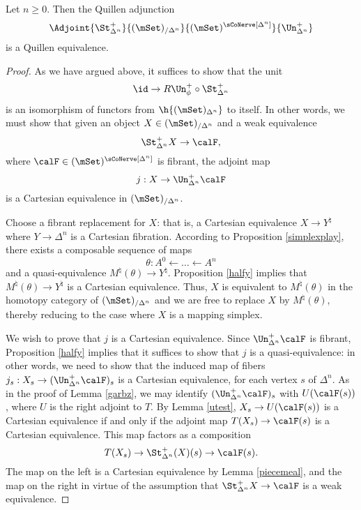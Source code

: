 \begin{proposition}\label{speccase}
Let $n \geq 0$. Then the Quillen adjunction 
$$\Adjoint{\St^{+}_{\Delta^n}}{ (\mSet)_{/ \Delta^n} }{ (\mSet)^{\sCoNerve[\Delta^n]}}{ \Un^{+}_{\Delta^n}}$$ is a Quillen equivalence.
\end{proposition}

\begin{proof}
As we have argued above, it suffices to show that the unit
$$ \id \rightarrow R \Un^{+}_{\phi} \circ \St^{+}_{\Delta^n}$$
is an isomorphism of functors from $\h{ (\mSet)_{\Delta^n}}$ to itself. In other words, we must show that given an object
$X \in (\mSet)_{/ \Delta^n}$ and a weak equivalence
$$ \St^{+}_{\Delta^n} X \rightarrow \calF,$$
where $\calF \in (\mSet)^{\sCoNerve[\Delta^n]}$ is fibrant, the adjoint map
$$ j: X \rightarrow \Un^{+}_{\Delta^n} \calF$$ is a Cartesian equivalence in $(\mSet)_{/ \Delta^n}$.

Choose a fibrant replacement for $X$: that is, a Cartesian equivalence  $X \rightarrow Y^{\natural}$ where $Y \rightarrow \Delta^n$ is a Cartesian fibration. According to Proposition \ref{simplexplay}, there exists a composable sequence of maps
$$ \theta: A^0 \leftarrow \ldots \leftarrow A^n$$
and a quasi-equivalence $M^{\natural}(\theta) \rightarrow Y^{\natural}$. Proposition \ref{halfy}
implies that $M^{\natural}(\theta) \rightarrow Y^{\natural}$ is a Cartesian equivalence. Thus,
$X$ is equivalent to $M^{\natural}(\theta)$ in the homotopy category of $(\mSet)_{/\Delta^n}$ and we are free to replace $X$ by $M^{\natural}(\theta)$, thereby reducing to the case where $X$ is a mapping simplex.

We wish to prove that $j$ is a Cartesian equivalence. Since $\Un^{+}_{\Delta^n} \calF$ is fibrant,
Proposition \ref{halfy} implies that it suffices to show that $j$ is a quasi-equivalence: in other words, 
we need to show that the induced map of fibers 
$j_s: X_{s} \rightarrow (\Un^{+}_{\Delta^n} \calF)_s$ is a Cartesian equivalence, for each vertex $s$ of $\Delta^n$. 
As in the proof of Lemma \ref{garbz}, we may identify $(\Un^{+}_{\Delta^n} \calF)_s$ with
$U(\calF(s))$, where $U$ is the right adjoint to $T$. By Lemma \ref{utest}, $X_{s} \rightarrow U (\calF(s))$ is a Cartesian equivalence if and only if the adjoint map
$T(X_{s}) \rightarrow \calF(s)$ is a Cartesian equivalence. This map factors as a composition
$$ T(X_{s}) \rightarrow \St^{+}_{\Delta^n}(X)(s) \rightarrow \calF(s).$$
The map on the left is a Cartesian equivalence by Lemma \ref{piecemeal}, and the map on
the right in virtue of the assumption that $\St^{+}_{\Delta^n} X \rightarrow \calF$ is a weak equivalence.
\end{proof}

